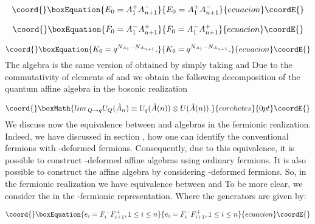 \documentclass[a4paper,12pt,thmsa]{article}
\begin{document}
\begin{equation}\coord{}\boxEquation{
E_{0}=A_{1}^{+}A_{n+1}^{-}
}{
E_{0}=A_{1}^{+}A_{n+1}^{-}
}{ecuacion}\coordE{}\end{equation}

\begin{equation}\coord{}\boxEquation{
F_{0}=A_{1}^{-}A_{n+1}^{+}
}{
F_{0}=A_{1}^{-}A_{n+1}^{+}
}{ecuacion}\coordE{}\end{equation}

\begin{equation}\coord{}\boxEquation{
K_0=q^{N_{A_1}-N_{A_{n+1}}}.
}{
K_0=q^{N_{A_1}-N_{A_{n+1}}}.
}{ecuacion}\coordE{}\end{equation}
The algebra \coordHE{} is the same version of \coordHE{} obtained by simply taking \coordHE{} and \coordHE{} Due to
the commutativity of elements of \coordHE{} and \coordHE{} we obtain the following decomposition of the quantum affine
algebra \coordHE{} in the bosonic realization

\[\coord{}\boxMath{
lim\, _{Q\rightarrow q}U_Q(\hat A_n)\equiv U_q(\hat A(n))\otimes
U(\hat A(n)).
}{corchetes}{0pt}\coordE{}\]
We discuss now the equivalence between \coordHE{} and \coordHE{}
algebras in the fermionic realization. Indeed, we have discussed in section \coordHE{}, how one can identify the conventional fermions with \coordHE{}-deformed
fermions. Consequently, due to this equivalence, it is possible to construct
\coordHE{}-deformed affine algebras \coordHE{} using ordinary fermions. It is
also possible to construct the affine algebra \coordHE{} by considering \coordHE{}-deformed fermions. So, in the fermionic realization we have equivalence
between \coordHE{} and \coordHE{} To be more clear, we consider the
\coordHE{} in the \coordHE{}-fermionic representation. Where the generators
are given by:

\begin{equation}\coord{}\boxEquation{
e_i=F_i^{-}F_{i+1}^{+},1\leq i\leq n
}{
e_i=F_i^{-}F_{i+1}^{+},1\leq i\leq n
}{ecuacion}\coordE{}\end{equation}
\end{document}
